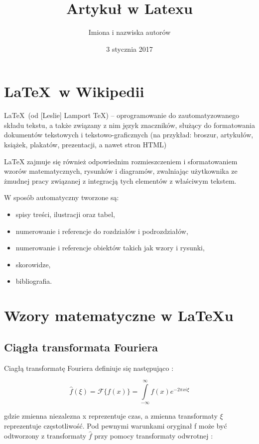 \documentclass[a4paper,11pt]{article}
\title{Artykuł w Latexu}
\date{3 stycznia 2017}
\author{Imiona i nazwiska autorów}
\begin{document}
\maketitle{} %
\newpage{} %
\tableofcontents{}



\section{\LaTeX\ w Wikipedii}
\LaTeX\ (od [Leslie] Lamport TeX) – oprogramowanie do zautomatyzowanego składu
tekstu, a także związany z nim język znaczników, służący do formatowania dokumentów
tekstowych i tekstowo-graficznych (na przykład: broszur, artykułów,
książek, plakatów, prezentacji, a nawet stron HTML) \cite{wikipedia_cytat}

LaTeX zajmuje się również odpowiednim rozmieszczeniem i sformatowaniem
wzorów matematycznych, rysunków i diagramów, zwalniając użytkownika ze
żmudnej pracy związanej z integracją tych elementów z właściwym tekstem.

W sposób automatyczny tworzone są:
\begin{itemize}
	\item spisy treści, ilustracji oraz tabel,
	\item numerowanie i referencje do rozdziałów i podrozdziałów,
	\item numerowanie i referencje obiektów takich jak wzory i rysunki,
	\item skorowidze,
	\item bibliografia.
\end{itemize}

\section{Wzory matematyczne w \LaTeX\/u}
\subsection{Ciągła transformata Fouriera}
Ciagłą transformatę Fouriera definiuje się następująco \cite{fourie}:

\begin{equation}
	\widehat{f}(\xi) = \mathcal{F}\{f(x)\} = \int\limits_{-\infty}^{\infty}f(x)e^{-2\pi x i \xi}
\end{equation}

gdzie zmienna niezalezna x reprezentuje czas, a zmienna transformaty $\xi$ reprezentuje częstotliwość.
 Pod pewnymi warunkami oryginał f może być odtworzony z transformaty $\widehat{f}$ 
przy pomocy transformaty odwrotnej \cite{fourie}:
\end{document}
